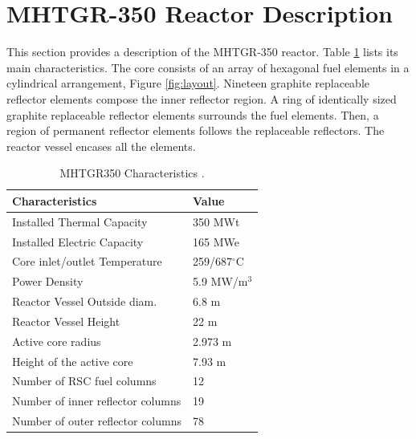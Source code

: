 \documentclass[11pt,letterpaper]{article}
\begin{document}
\section{\gls{MHTGR}-350 Reactor Description}

This section provides a description of the \gls{MHTGR}-350 reactor.
Table \ref{tab:maincharac} lists its main characteristics.
The core consists of an array of hexagonal fuel elements in a cylindrical arrangement, Figure \ref{fig:layout}.
Nineteen graphite replaceable reflector elements compose the inner reflector region.
A ring of identically sized graphite replaceable reflector elements surrounds the fuel elements.
Then, a region of permanent reflector elements follows the replaceable reflectors.
The reactor vessel encases all the elements.

\begin{table}[htbp!]
	\centering
    \caption{MHTGR350 Characteristics \cite{oecd_nea_benchmark_2017}.}
	\begin{tabular}{ll}
  \toprule
	Characteristics                   & Value               \\ \midrule
	Installed Thermal Capacity        & 350 MWt             \\
	Installed Electric Capacity       & 165 MWe             \\
	Core inlet/outlet Temperature     & 259/687$^{\circ}$C  \\
	Power Density                     & 5.9 MW/m$^3$        \\
  Reactor Vessel Outside diam.      & 6.8 m               \\
	Reactor Vessel Height             & 22 m                \\
	Active core radius                & 2.973 m             \\
	Height of the active core         & 7.93 m              \\
	Number of RSC fuel columns        & 12                  \\
	Number of inner reflector columns & 19                  \\
	Number of outer reflector columns & 78                  \\
  \bottomrule
	\end{tabular}
  \label{tab:maincharac}
\end{table}
\end{document}
